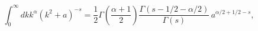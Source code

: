 \begin{equation}
\int_0^\infty dk k^\alpha (k^2+a)^{-s}=\frac{1}{2}
\Gamma\left(\frac{\alpha+1}{2}\right)
\frac{\Gamma(s-1/2-\alpha/2)}{\Gamma(s)}\,a^{\alpha/2+1/2-s},
\end{equation}

